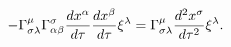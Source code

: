 \begin{equation}
-\Gamma _{\sigma \lambda }^{\mu }\Gamma _{\alpha \beta }^{\sigma }\frac{%
dx^{\alpha }}{d\tau }\frac{dx^{\beta }}{d\tau }\xi ^{\lambda }=\Gamma
_{\sigma \lambda }^{\mu }\frac{d^{2}x^{\sigma }}{d\tau ^{2}}\xi ^{\lambda }.
\label{12}
\end{equation}

